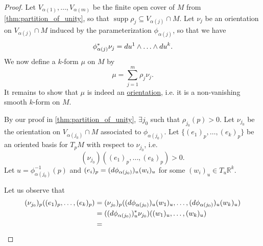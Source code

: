 \documentclass[notoc,notitlepage]{tufte-book}
\DeclareMathOperator{\supp}{supp}
\begin{document}
\begin{proof}
  Let $V_{\alpha(1)}, \ldots, V_{\alpha(m)}$ be the finite open cover of $M$
  from \cref{thm:partition_of_unity}, so that $\supp \rho_j \subseteq
  V_{\alpha(j)} \cap M$. Let $\nu_j$ be an orientation on $V_{\alpha(j)} \cap M$
  induced by the parameterization $\phi_{\alpha(j)}$, so that we have
  \begin{equation*}
    \phi_{\alpha(j)}^* \nu_j = \mathop{}\!d{u^1} \land \hdots \land \mathop{}\!d{u^k}.
  \end{equation*}
  We now define a $k$-form $\mu$ on $M$ by
  \begin{equation*}
    \mu = \sum_{j=1}^{m} \rho_j \nu_j.
  \end{equation*}
  It remains to show that $\mu$ is indeed an
  \hyperref[defn:orientable_submanifolds]{orientation}, i.e. it is a
  non-vanishing smooth $k$-form on $M$.

  By our proof in \cref{thm:partition_of_unity}, $\exists j_0$ such that
  $\rho_{j_0}(p) > 0$. Let $\nu_{j_0}$ be the orientation on $V_{\alpha(j_0)}
  \cap M$ associated to $\phi_{\alpha(j_0)}$. Let $\{(e_1)_p, \ldots, (e_k)_p\}$ 
  be an oriented basis for $T_p M$ with respect to $\nu_{j_0}$, i.e.
  \begin{equation*}
    (\nu_{j_0})((e_1)_p, \ldots, (e_k)_p) > 0.
  \end{equation*}
  Let $u = \phi_{\alpha(j_0)}^{-1}(p)$ and $(e_i)_p =
  (\mathop{}\!d{\phi_{\alpha(j_0)}})_u (w_i)_u$ for some $(w_i)_u \in T_u \mathbb{R}^k$.

  Let us observe that
  \begin{align*}
    (\nu_{j_0})_p ((e_1)_p, \ldots, (e_k)_p)
    &= (\nu_{j_0})_p ((\mathop{}\!d{\phi_{\alpha(j_0)}})_u (w_1)_u, \ldots,
      (\mathop{}\!d{\phi_{\alpha(j_0)}})_u (w_k)_u) \\
    &= ((\mathop{}\!d{\phi_{\alpha(j_0)}})_u^* \nu_{j_0})((w_1)_u, \ldots, (w_k)_u) \\
    &= 
  \end{align*}
\end{proof}
\end{document}

